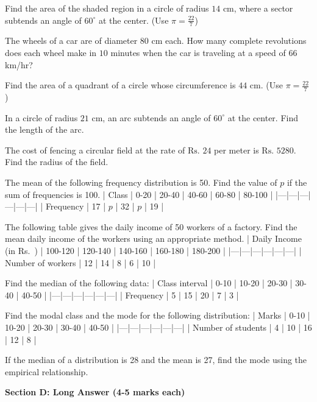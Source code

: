 \documentclass[12pt,a4paper]{exam}
\begin{document}
\begin{questions}
\question[3] Find the area of the shaded region in a circle of radius $14$ cm, where a sector subtends an angle of $60^{\circ}$ at the center. (Use $\pi = \frac{22}{7}$)
\vspace{0.15cm}

\question[3] The wheels of a car are of diameter $80$ cm each. How many complete revolutions does each wheel make in $10$ minutes when the car is traveling at a speed of $66$ km/hr?
\vspace{0.15cm}

\question[3] Find the area of a quadrant of a circle whose circumference is $44$ cm. (Use $\pi = \frac{22}{7}$)
\vspace{0.15cm}

\question[3] In a circle of radius $21$ cm, an arc subtends an angle of $60^{\circ}$ at the center. Find the length of the arc.
\vspace{0.15cm}

\question[3] The cost of fencing a circular field at the rate of $\text{Rs.~} 24$ per meter is $\text{Rs.~} 5280$. Find the radius of the field.
\vspace{0.15cm}

\question[3] The mean of the following frequency distribution is 50. Find the value of $p$ if the sum of frequencies is 100.
| Class | 0-20 | 20-40 | 40-60 | 60-80 | 80-100 |
|---|---|---|---|---|---|
| Frequency | 17 | $p$ | 32 | $p$ | 19 |
\vspace{0.15cm}

\question[3] The following table gives the daily income of 50 workers of a factory. Find the mean daily income of the workers using an appropriate method.
| Daily Income (in Rs.~) | 100-120 | 120-140 | 140-160 | 160-180 | 180-200 |
|---|---|---|---|---|---|
| Number of workers | 12 | 14 | 8 | 6 | 10 |
\vspace{0.15cm}

\question[3] Find the median of the following data:
| Class interval | 0-10 | 10-20 | 20-30 | 30-40 | 40-50 |
|---|---|---|---|---|---|
| Frequency | 5 | 15 | 20 | 7 | 3 |
\vspace{0.15cm}

\question[3] Find the modal class and the mode for the following distribution:
| Marks | 0-10 | 10-20 | 20-30 | 30-40 | 40-50 |
|---|---|---|---|---|---|
| Number of students | 4 | 10 | 16 | 12 | 8 |
\vspace{0.15cm}

\question[3] If the median of a distribution is 28 and the mean is 27, find the mode using the empirical relationship.
\vspace{0.15cm}

\end{questions}
\bigskip
\noindent\textbf{\large Section D: Long Answer (4-5 marks each)}
\end{document}
